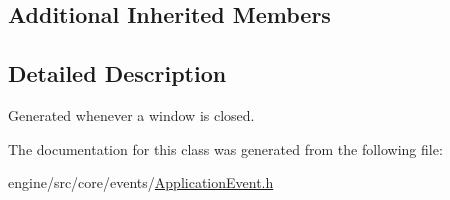 \subsection*{Additional Inherited Members}


\subsection{Detailed Description}
Generated whenever a window is closed. 

The documentation for this class was generated from the following file\+:\begin{DoxyCompactItemize}
\item 
engine/src/core/events/\hyperlink{ApplicationEvent_8h}{Application\+Event.\+h}\end{DoxyCompactItemize}
